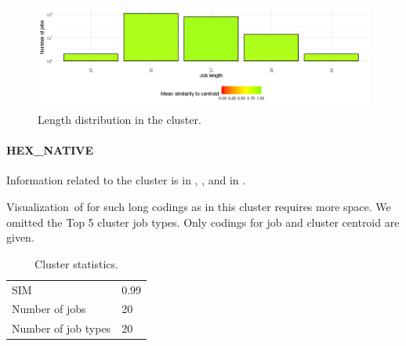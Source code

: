 \documentclass[]{llncs}
\begin{document}
\begin{figure}
  \centering
  \includegraphics[width=4.61in,height=1.39in]{./media/image17.png}
  \caption{Length distribution in the cluster.}
  \label{fig:use_case:hex_lev:length}
\end{figure}



\paragraph{HEX\_NATIVE}
Information related to the cluster is in , , and in .

Visualization\ of for such long codings as in this cluster requires more space. We omitted the Top 5 cluster job types. Only codings for job and cluster centroid are given.  

\begin{table}
  \centering
  \begin{tabular}{ll}
    SIM & 0.99 \\
    Number of jobs & 20 \\
    Number of job types & 20 \\
  \end{tabular}
  \caption{Cluster statistics.}
  \label{tab:use_case:hex_native:stats}
\end{table}
\end{document}
